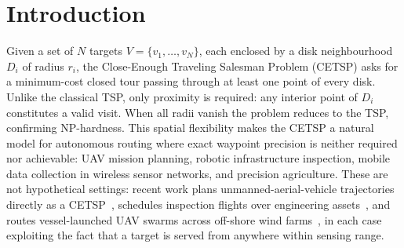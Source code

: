 \documentclass[a4paper,fleqn]{cas-dc}
\begin{document}
\section{Introduction}\label{sec:intro}

Given a set of $N$ targets $V=\{v_1,\dots,v_N\}$, each enclosed by a disk
neighbourhood $D_i$ of radius $r_i$, the Close-Enough Traveling Salesman Problem
(CETSP) asks for a minimum-cost closed tour passing through at least one point
of every disk. Unlike the classical TSP, only proximity is required: any
interior point of $D_i$ constitutes a valid visit. When all radii vanish the
problem reduces to the TSP, confirming NP-hardness. This spatial flexibility
makes the CETSP a natural model for autonomous routing where exact waypoint
precision is neither required nor achievable: UAV mission planning, robotic
infrastructure inspection, mobile data collection in wireless sensor networks,
and precision agriculture. These are not hypothetical settings: recent work
plans unmanned-aerial-vehicle trajectories directly as a
CETSP~\citep{cariou2023geometric}, schedules inspection flights over engineering
assets~\citep{zhen2024uavinspection}, and routes vessel-launched UAV swarms
across off-shore wind farms~\citep{ismail2025uavwind}, in each case exploiting
the fact that a target is served from anywhere within sensing range.
\end{document}
